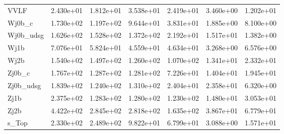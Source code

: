 \begin{table}
{\begin{tabularx}{\textwidth}{|X|X|X|X|X|X|X|}
VVLF & 2.430e+01 & 1.812e+01 & 3.538e+01 & 2.419e+01 & 3.460e+00 & 1.202e+01 \\
Wj0b\_c & 1.730e+02 & 1.197e+02 & 9.644e+01 & 3.831e+01 & 1.885e+00 & 8.100e+00 \\
Wj0b\_udsg & 1.626e+02 & 1.528e+02 & 1.372e+02 & 2.192e+01 & 1.517e+01 & 1.382e+00 \\
Wj1b & 7.076e+01 & 5.824e+01 & 4.559e+01 & 4.634e+01 & 3.268e+00 & 6.576e+00 \\
Wj2b & 1.540e+02 & 1.497e+02 & 1.260e+02 & 1.070e+02 & 1.341e+01 & 2.332e+01 \\
Zj0b\_c & 1.767e+02 & 1.287e+02 & 1.281e+02 & 7.226e+01 & 1.404e+01 & 1.945e+01 \\
Zj0b\_udsg & 1.839e+02 & 1.240e+02 & 1.310e+02 & 2.404e+01 & 2.358e+01 & 6.320e+00 \\
Zj1b & 2.375e+02 & 1.283e+02 & 1.280e+02 & 1.230e+02 & 1.480e+01 & 3.053e+01 \\
Zj2b & 4.422e+02 & 2.845e+02 & 2.818e+02 & 1.635e+02 & 3.867e+01 & 6.779e+01 \\
s\_Top & 2.330e+02 & 2.489e+02 & 9.822e+01 & 6.799e+01 & 3.088e+00 & 1.571e+01 \\
\hline
\end{tabularx}
}
\label{tab:sr-Znn-2018}
\end{table}

